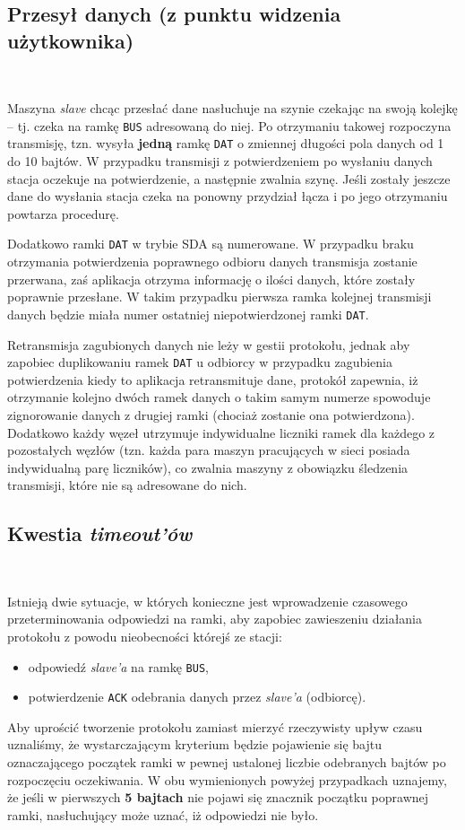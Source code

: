 \documentclass[a4paper,12pt]{article}
\begin{document}
\subsection{Przesył danych (z punktu widzenia użytkownika)}\

Maszyna \emph{slave} chcąc przesłać dane nasłuchuje na szynie czekając na
swoją kolejkę -- tj. czeka na ramkę \texttt{BUS} adresowaną do niej. Po
otrzymaniu takowej rozpoczyna transmisję, tzn. wysyła \textbf{jedną} ramkę
\texttt{DAT} o zmiennej długości pola danych od 1 do 10 bajtów. W przypadku
transmisji z potwierdzeniem po wysłaniu danych stacja oczekuje na
potwierdzenie, a następnie zwalnia szynę. Jeśli zostały jeszcze dane do
wysłania stacja czeka na ponowny przydział łącza i po jego otrzymaniu powtarza
procedurę.

Dodatkowo ramki \texttt{DAT} w trybie SDA są numerowane. W przypadku braku
otrzymania potwierdzenia poprawnego odbioru danych transmisja zostanie
przerwana, zaś aplikacja otrzyma informację o ilości danych, które zostały
poprawnie przesłane. W takim przypadku pierwsza ramka kolejnej transmisji
danych będzie miała numer ostatniej niepotwierdzonej ramki \texttt{DAT}.

Retransmisja zagubionych danych nie leży w gestii protokołu, jednak aby
zapobiec duplikowaniu ramek \texttt{DAT} u odbiorcy w przypadku zagubienia
potwierdzenia kiedy to aplikacja retransmituje dane, protokół zapewnia, iż
otrzymanie kolejno dwóch ramek danych o takim samym numerze spowoduje
zignorowanie danych z drugiej ramki (chociaż zostanie ona potwierdzona).
Dodatkowo każdy węzeł utrzymuje indywidualne liczniki ramek dla każdego z
pozostałych węzłów (tzn. każda para maszyn pracujących w sieci posiada
indywidualną parę liczników), co zwalnia maszyny z obowiązku śledzenia
transmisji, które nie są adresowane do nich.

\subsection{Kwestia \emph{timeout'ów}}\

Istnieją dwie sytuacje, w których konieczne jest wprowadzenie czasowego
przeterminowania odpowiedzi na ramki, aby zapobiec zawieszeniu działania
protokołu z powodu nieobecności którejś ze stacji:
\begin{itemize}
  \item odpowiedź \emph{slave'a} na ramkę \texttt{BUS},
  \item potwierdzenie \texttt{ACK} odebrania danych przez \emph{slave'a}
        (odbiorcę).
\end{itemize}
Aby uprościć tworzenie protokołu zamiast mierzyć rzeczywisty upływ czasu
uznaliśmy, że wystarczającym kryterium będzie pojawienie się bajtu
oznaczającego początek ramki w pewnej ustalonej liczbie odebranych bajtów po
rozpoczęciu oczekiwania. W obu wymienionych powyżej przypadkach uznajemy, że
jeśli w pierwszych \textbf{5 bajtach} nie pojawi się znacznik początku
poprawnej ramki, nasłuchujący może uznać, iż odpowiedzi nie było.
\end{document}
